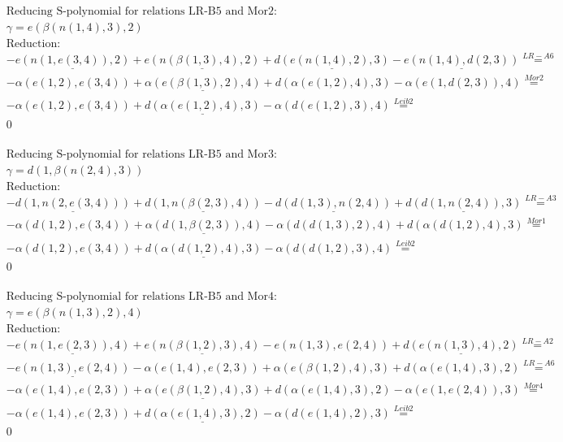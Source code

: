 \documentclass[11pt]{amsart}
\begin{document}
\begin{align*} 
& \text{Reducing S-polynomial for relations LR-B5 and Mor2:} \\ 
& \gamma = e(\beta(n(1,4),3),2) \\ 
& \text{Reduction}: \\& - \underline{e(n(1,e(3,4)),2)} + \underline{e(n(\beta(1,3),4),2)} + \underline{d(e(n(1,4),2),3)} - \underline{e(n(1,4),d(2,3))} \stackrel{ LR-A6 }{=}  \\ 
& - \alpha(e(1,2),e(3,4)) + \underline{\alpha(e(\beta(1,3),2),4)} + d(\alpha(e(1,2),4),3) - \alpha(e(1,d(2,3)),4) \stackrel{ Mor2 }{=}  \\ 
& - \alpha(e(1,2),e(3,4)) + \underline{d(\alpha(e(1,2),4),3)} - \alpha(d(e(1,2),3),4) \stackrel{ Leib2 }{=}  \\ 
&0\\ 
\end{align*} 
 
\begin{align*} 
& \text{Reducing S-polynomial for relations LR-B5 and Mor3:} \\ 
& \gamma = d(1,\beta(n(2,4),3)) \\ 
& \text{Reduction}: \\& - \underline{d(1,n(2,e(3,4)))} + \underline{d(1,n(\beta(2,3),4))} - \underline{d(d(1,3),n(2,4))} + \underline{d(d(1,n(2,4)),3)} \stackrel{ LR-A3 }{=}  \\ 
& - \alpha(d(1,2),e(3,4)) + \underline{\alpha(d(1,\beta(2,3)),4)} - \alpha(d(d(1,3),2),4) + d(\alpha(d(1,2),4),3) \stackrel{ Mor1 }{=}  \\ 
& - \alpha(d(1,2),e(3,4)) + \underline{d(\alpha(d(1,2),4),3)} - \alpha(d(d(1,2),3),4) \stackrel{ Leib2 }{=}  \\ 
&0\\ 
\end{align*} 
 
\begin{align*} 
& \text{Reducing S-polynomial for relations LR-B5 and Mor4:} \\ 
& \gamma = e(\beta(n(1,3),2),4) \\ 
& \text{Reduction}: \\& - \underline{e(n(1,e(2,3)),4)} + \underline{e(n(\beta(1,2),3),4)} - e(n(1,3),e(2,4)) + \underline{d(e(n(1,3),4),2)} \stackrel{ LR-A2 }{=}  \\ 
& - \underline{e(n(1,3),e(2,4))} - \alpha(e(1,4),e(2,3)) + \alpha(e(\beta(1,2),4),3) + d(\alpha(e(1,4),3),2) \stackrel{ LR-A6 }{=}  \\ 
& - \alpha(e(1,4),e(2,3)) + \underline{\alpha(e(\beta(1,2),4),3)} + d(\alpha(e(1,4),3),2) - \alpha(e(1,e(2,4)),3) \stackrel{ Mor4 }{=}  \\ 
& - \alpha(e(1,4),e(2,3)) + \underline{d(\alpha(e(1,4),3),2)} - \alpha(d(e(1,4),2),3) \stackrel{ Leib2 }{=}  \\ 
&0\\ 
\end{align*} 
 
\end{document}
